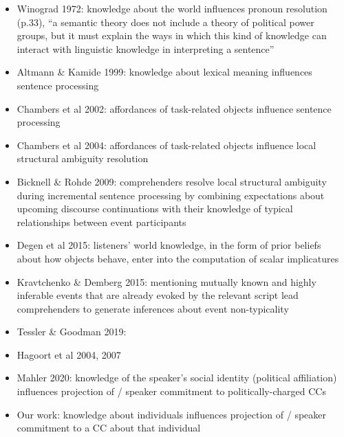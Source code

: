 \documentclass[11pt,fleqn]{article}
\newcommand{\6}{\mbox{$[\hspace*{-.6mm}[$}}
\newcommand{\9}{\mbox{$]\hspace*{-.6mm}]$}}
\begin{document}
\begin{itemize}

\item Winograd 1972: knowledge about the world influences pronoun resolution (p.33), ``a semantic theory does not include a theory of political power groups, but it must explain the ways in which this kind of knowledge can interact with linguistic knowledge in interpreting a sentence''

\item Altmann \& Kamide 1999: knowledge about lexical meaning influences sentence processing

\item Chambers et al 2002: affordances of task-related objects influence sentence processing

\item Chambers et al 2004: affordances of task-related objects influence local structural ambiguity resolution

\item Bicknell \& Rohde 2009: comprehenders resolve local structural ambiguity during incremental sentence processing by combining expectations about upcoming discourse continuations with their knowledge of typical relationships between event participants

\item Degen et al 2015: listeners' world knowledge, in the form of prior beliefs about how objects behave, enter into the computation of scalar implicatures

\item Kravtchenko \& Demberg 2015: mentioning mutually known and highly inferable events that are already evoked by the relevant script lead comprehenders to generate inferences about event non-typicality

\item Tessler \& Goodman 2019: 

\item Hagoort et al 2004, 2007

\item Mahler 2020: knowledge of the speaker's social identity (political affiliation) influences projection of / speaker commitment to politically-charged CCs

\item Our work: knowledge about individuals influences projection of / speaker commitment to a CC about that individual

\end{itemize}
\end{document}
